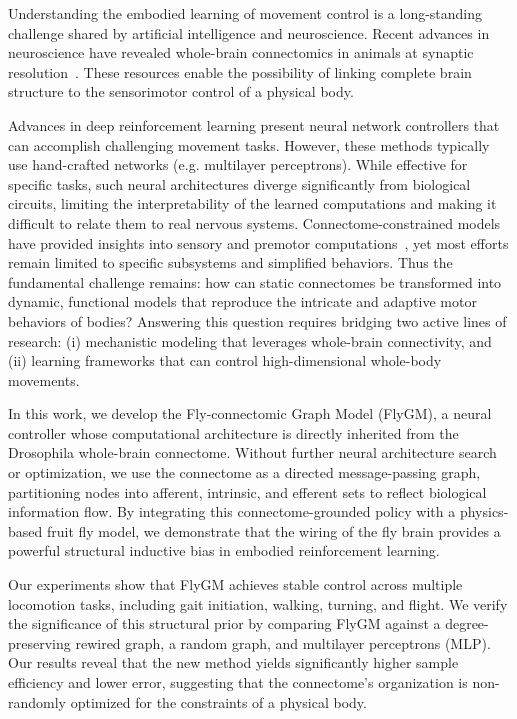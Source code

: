 \documentclass{article}
\theoremstyle{plain}
\theoremstyle{definition}
\theoremstyle{remark}
\begin{document}
Understanding the embodied learning of movement control is a long-standing challenge shared by artificial intelligence and neuroscience. Recent advances in neuroscience have revealed whole-brain connectomics in animals at synaptic resolution~\citep{Dorkenwald2024a}. These resources enable the possibility of linking complete brain structure to the sensorimotor control of a physical body. 

Advances in deep reinforcement learning present neural network controllers that can accomplish challenging movement tasks. However, these methods typically use hand-crafted networks (e.g. multilayer perceptrons). While effective for specific tasks, such neural architectures diverge significantly from biological circuits, limiting the interpretability of the learned computations and making it difficult to relate them to real nervous systems. Connectome-constrained models have provided insights into sensory and premotor computations~\citep{Azevedo2024}, yet most efforts remain limited to specific subsystems and simplified behaviors. Thus the fundamental challenge remains: how can static connectomes be transformed into dynamic, functional models that reproduce the intricate and adaptive motor behaviors of bodies? Answering this question requires bridging two active lines of research: (i) mechanistic modeling that leverages whole-brain connectivity, and (ii) learning frameworks that can control high-dimensional whole-body movements.

In this work, we develop the Fly-connectomic Graph Model (FlyGM), a neural controller whose computational architecture is directly inherited from the Drosophila whole-brain connectome. Without further neural architecture search or optimization, we use the connectome as a directed message-passing graph, partitioning nodes into afferent, intrinsic, and efferent sets to reflect biological information flow. By integrating this connectome-grounded policy with a physics-based fruit fly model, we demonstrate that the wiring of the fly brain provides a powerful structural inductive bias in embodied reinforcement learning.

Our experiments show that FlyGM achieves stable control across multiple locomotion tasks, including gait initiation, walking, turning, and flight. We verify the significance of this structural prior by comparing FlyGM against a degree-preserving rewired graph, a random graph, and multilayer perceptrons (MLP). Our results reveal that the new method yields significantly higher sample efficiency and lower error, suggesting that the connectome's organization is non-randomly optimized for the constraints of a physical body.
\end{document}
